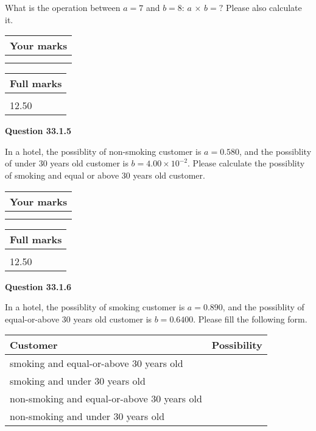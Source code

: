 \documentclass[12pt]{article}
\begin{document}
  
What is the operation between $a= %
7$ and $b= %
8$:
$a$  %
$\times$ $b=?$ Please also calculate it.

 
\vspace{0.3in}
  
\vspace{0.2in}
  
         \begin{tabular}{|l|}
\hline
 Your marks  \\
\hline
 \\ 
 \\ 
\hline
\end{tabular}
\hspace{0.05in} \begin{tabular}{|l|}
\hline
 Full marks  \\
\hline
 \\ 
12.50 \\
\hline
\end{tabular}
{\textbf{\Large{Question
33.1.5 
}}}
  
  
In a hotel, the possiblity of  %
non-smoking customer is
$a =  %
0.580$, and the possiblity of  %
 under 30 years old customer is $ b =  %
4.00 \times 10^{-2}$.
Please calculate the possiblity of  %
smoking and  %
equal or above 30 years old customer.
 

 

 
\vspace{0.3in}
  
\vspace{0.2in}
  
         \begin{tabular}{|l|}
\hline
 Your marks  \\
\hline
 \\ 
 \\ 
\hline
\end{tabular}
\hspace{0.05in} \begin{tabular}{|l|}
\hline
 Full marks  \\
\hline
 \\ 
12.50 \\
\hline
\end{tabular}
{\textbf{\Large{Question
33.1.6 
}}}
  
  
In a hotel, the possiblity of  %
smoking customer is
$a =  %
0.890$, and the possiblity of  %
equal-or-above 30 years old customer is $ b =  %
0.6400$.
Please fill the following form.
 
\noindent
\begin{tabular}{|l|l|}
\hline
Customer & Possibility \\
\hline
smoking  and   %
equal-or-above 30 years old  & \\
\hline
smoking  and   %
under 30 years old & \\
\hline
 non-smoking and   %
equal-or-above 30 years old  & \\
\hline
 non-smoking and  %
under 30 years old & \\
\hline
\end{tabular}
 
\end{document}
